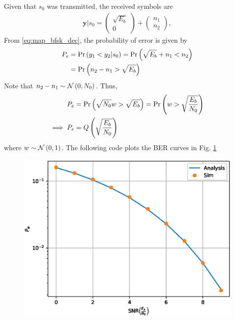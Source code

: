\documentclass[10pt, a4paper]{article}
\begin{document}
\begin{enumerate}
\solution Given that $s_0$ was transmitted, the received symbols are
\begin{align}
\mathbf{y}|s_0 = 
\begin{pmatrix}
\sqrt{E_b} \\
0
\end{pmatrix}
+
\begin{pmatrix}
 n_{1}\\
n_{2}
\end{pmatrix},
\end{align}
From \eqref{eq:map_bfsk_dec}, 
the probability of error is given by
\begin{align}
P_e &= \Pr\left(y_1 < y_2|s_0\right) = \Pr\left(\sqrt{E_b} + n_1 < n_2\right)
\\
&= \Pr\left( n_2-n_1 > \sqrt{E_b} \right) 
\label{eq:bfsk_proof_n0}
\end{align}
Note that $n_2-n_1 \sim \mathcal{N}\left(0,N_0\right)$. Thus, 
\begin{align}
P_e &= \Pr\left( \sqrt{N_0}w > \sqrt{E_b} \right)  =  \Pr\left( w > \sqrt{\frac{E_b}{N_0}} \right)
\\
\implies 
P_e & = Q\left(\sqrt{\frac{E_b}{N_0}}\right)
\end{align}
where 
$w \sim \mathcal{N}\left(0,1\right)$.  
%
The following code plots the BER curves in Fig. \ref{fig:bfsk_ber}
\begin{center}
\end{center}
\begin{figure}[!h]
\centering
\includegraphics[width=\columnwidth]{bfsk_ber.eps}
\caption{}
\label{fig:bfsk_ber}
\end{figure}

\end{enumerate}
%
\end{document}
